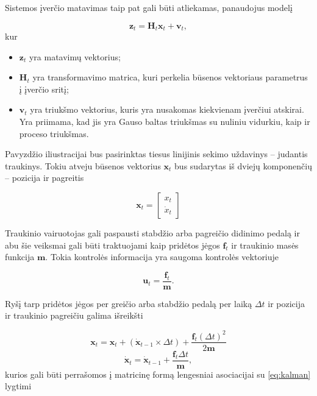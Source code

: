     Sistemos įverčio matavimas taip pat gali būti atliekamas, panaudojus modelį

    \begin{equation}
        \mathbf{z}_t = \mathbf{H}_t\mathbf{x}_t + \mathbf{v}_t,
    \end{equation}
    kur
    \begin{itemize}
        \item $\mathbf{z}_t$ yra matavimų vektorius;
        \item $\mathbf{H}_t$ yra transformavimo matrica, kuri perkelia būsenos vektoriaus parametrus į įverčio sritį;
        \item $\mathbf{v}_t$ yra triukšmo vektorius, kuris yra nusakomas kiekvienam įverčiui atskirai. Yra priimama, kad jis yra Gauso baltas triukšmas su nuliniu vidurkiu, kaip ir proceso triukšmas.
    \end{itemize}

    Pavyzdžio iliustracijai bus pasirinktas tiesus linijinis sekimo uždavinys -- judantis traukinys. Tokiu atveju būsenos vektorius $\mathbf{x}_t$ bus sudarytas iš dviejų komponenčių -- pozicija ir pagreitis

    \begin{equation}
        \mathbf{x}_t = \left[ \begin{matrix} x_t \\ \dot{x}_t \end{matrix} \right]
    \end{equation}

    Traukinio vairuotojas gali paspausti stabdžio arba pagreičio didinimo pedalą ir abu šie veiksmai gali būti traktuojami kaip pridėtos jėgos $\mathbf{f}_t$ ir traukinio masės funkcija $\mathbf{m}$. Tokia kontrolės informacija yra saugoma kontrolės vektoriuje

    \begin{equation}
        \mathbf{u}_t = \frac{\mathbf{f}_t}{\mathbf{m}}.
    \end{equation}

    Ryšį tarp pridėtos jėgos per greičio arba stabdžio pedalą per laiką $\Delta t$ ir pozicija ir traukinio pagreičiu galima išreikšti

    \begin{equation}
        \mathbf{x}_t = \mathbf{x}_t + (\dot{\mathbf{x}}_{t-1} \times \Delta t) + \frac{\mathbf{f}_t(\Delta t)^2}{2\mathbf{m}}
    \end{equation}
    \begin{equation}
        \dot{\mathbf{x}}_t = \dot{\mathbf{x}}_{t-1} + \frac{\mathbf{f}_t \Delta t}{\mathbf{m}},
    \end{equation}
    kurios gali būti perrašomos į matricinę formą lengesniai asociacijai su \ref{eq:kalman} lygtimi

